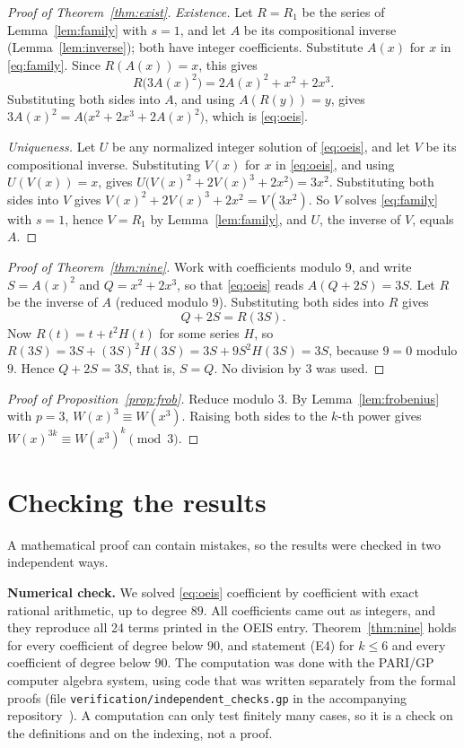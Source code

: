 \documentclass[11pt,a4paper]{article}
\theoremstyle{definition}
\theoremstyle{remark}
\newcommand{\para}[1]{\par\medskip\noindent\textbf{#1}\enspace}
\begin{document}
\begin{proof}[Proof of Theorem~\ref{thm:exist}]
\emph{Existence.} Let $R=R_1$ be the series of Lemma~\ref{lem:family} with $s=1$, and let $A$ be its compositional
inverse (Lemma~\ref{lem:inverse}); both have integer coefficients. Substitute $A(x)$ for $x$ in \eqref{eq:family}.
Since $R(A(x))=x$, this gives
\[
R\bigl(3A(x)^2\bigr)=2A(x)^2+x^2+2x^3 .
\]
Substituting both sides into $A$, and using $A(R(y))=y$, gives $3A(x)^2=A\bigl(x^2+2x^3+2A(x)^2\bigr)$, which is
\eqref{eq:oeis}.

\emph{Uniqueness.} Let $U$ be any normalized integer solution of \eqref{eq:oeis}, and let $V$ be its compositional
inverse. Substituting $V(x)$ for $x$ in \eqref{eq:oeis}, and using $U(V(x))=x$, gives
$U\bigl(V(x)^2+2V(x)^3+2x^2\bigr)=3x^2$. Substituting both sides into $V$ gives $V(x)^2+2V(x)^3+2x^2=V(3x^2)$. So $V$
solves \eqref{eq:family} with $s=1$, hence $V=R_1$ by Lemma~\ref{lem:family}, and $U$, the inverse of $V$, equals $A$.
\end{proof}

\begin{proof}[Proof of Theorem~\ref{thm:nine}]
Work with coefficients modulo $9$, and write $S=A(x)^2$ and $Q=x^2+2x^3$, so that \eqref{eq:oeis} reads
$A(Q+2S)=3S$. Let $R$ be the inverse of $A$ (reduced modulo $9$). Substituting both sides into $R$ gives
\[
Q+2S=R(3S).
\]
Now $R(t)=t+t^2H(t)$ for some series $H$, so $R(3S)=3S+(3S)^2H(3S)=3S+9S^2H(3S)=3S$, because $9=0$ modulo $9$. Hence
$Q+2S=3S$, that is, $S=Q$. No division by $3$ was used.
\end{proof}

\begin{proof}[Proof of Proposition~\ref{prop:frob}]
Reduce modulo $3$. By Lemma~\ref{lem:frobenius} with $p=3$, $W(x)^3\equiv W(x^3)$. Raising both sides to the $k$-th
power gives $W(x)^{3k}\equiv W(x^3)^k\pmod 3$.
\end{proof}

\section{Checking the results}\label{sec:checks}

A mathematical proof can contain mistakes, so the results were checked in two independent ways.

\para{Numerical check.}
We solved \eqref{eq:oeis} coefficient by coefficient with exact rational arithmetic, up to degree $89$. All
coefficients came out as integers, and they reproduce all 24 terms printed in the OEIS entry. Theorem~\ref{thm:nine}
holds for every coefficient of degree below $90$, and statement (E4) for $k\le6$ and every coefficient of degree below
$90$.
The computation was done with the PARI/GP computer algebra system, using code that was written separately from the
formal proofs (file \texttt{verification/independent\_checks.gp} in the accompanying repository~\cite{repo}).
A computation can only test finitely many cases, so it is a check on the definitions and on the indexing, not a proof.
\end{document}

